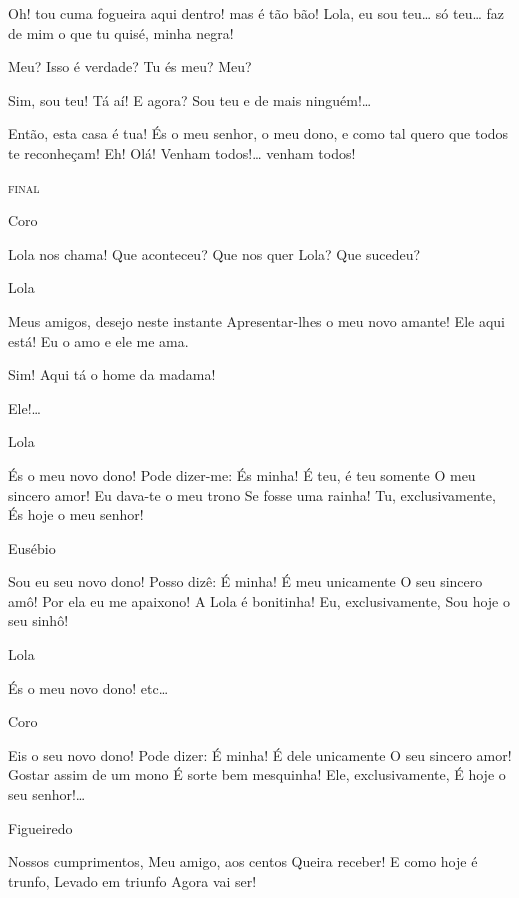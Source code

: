  Oh! tou cuma fogueira aqui dentro! mas é tão bão!  Lola, eu sou teu\ldots{} só teu\ldots{} faz de mim o que tu quisé, minha negra!

 Meu? Isso é verdade? Tu és meu? Meu?

 Sim, sou teu! Tá aí! E agora? Sou teu e de mais ninguém!\ldots{}

 Então, esta casa é tua! És o meu senhor, o meu dono, e como tal
quero que todos te reconheçam!  Eh! Olá! Venham
todos!\ldots{} venham todos! 



\begin{center}
\textsc{final}
\end{center}

 Coro

 Lola nos chama!
 Que aconteceu?
 Que nos quer Lola?
 Que sucedeu?

 Lola

 Meus amigos, desejo neste instante
 Apresentar-lhes o meu novo amante!
 Ele aqui está! Eu o amo e ele me ama.

 Sim! Aqui tá o home da madama!

 Ele!\ldots{} 

 Lola

 És o meu novo dono!
 Pode dizer-me: És minha!
 É teu, é teu somente
 O meu sincero amor!
 Eu dava-te o meu trono
 Se fosse uma rainha!
 Tu, exclusivamente,
 És hoje o meu senhor!

 Eusébio

 Sou eu seu novo dono!
 Posso dizê: É minha!
 É meu unicamente
 O seu sincero amô!
 Por ela eu me apaixono!
 A Lola é bonitinha!
 Eu, exclusivamente,
 Sou hoje o seu sinhô!

 Lola

 És o meu novo dono! etc\ldots{}

 Coro

 Eis o seu novo dono!
 Pode dizer: É minha!
 É dele unicamente
 O seu sincero amor!
 Gostar assim de um mono
 É sorte bem mesquinha!
 Ele, exclusivamente,
 É hoje o seu senhor!\ldots{}

 Figueiredo

\repl{} 
 Nossos cumprimentos,
 Meu amigo, aos centos
 Queira receber!
 E como hoje é trunfo,
 Levado em triunfo
 Agora vai ser!

